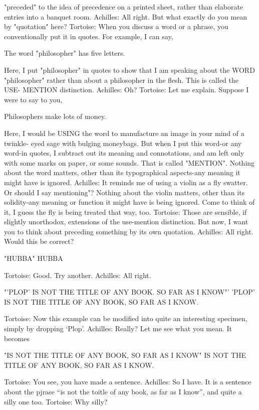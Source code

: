   "preceded" to the idea of precedence on a printed sheet, rather than elaborate entries
  into a banquet room.
Achilles: All right. But what exactly do you mean by "quotation" here? Tortoise: When
  you discuss a word or a phrase, you conventionally put it in quotes. For example, I can
  say,

                           The word "philosopher" has five letters.

  Here, I put "philosopher" in quotes to show that I am speaking about the WORD
  "philosopher" rather than about a philosopher in the flesh. This is called the USE-
  MENTION distinction.
Achilles: Oh?
Tortoise: Let me explain. Suppose I were to say to you,

                            Philosophers make lots of money.

  Here, I would be USING the word to manufacture an image in your mind of a twinkle-
  eyed sage with bulging moneybags. But when I put this word-or any word-in quotes, I
  subtract out its meaning and connotations, and am left only with some marks on paper,
  or some sounds. That is called "MENTION". Nothing about the word matters, other
  than its typographical aspects-any meaning it might have is ignored.
Achilles: It reminds me of using a violin as a fly swatter. Or should I say mentioning"?
  Nothing about the violin matters, other than its solidity-any meaning or function it
  might have is being ignored. Come to think of it, I guess the fly is being treated that
  way, too.
Tortoise: Those are sensible, if slightly unorthodox, extensions of the use-mention
  distinction. But now, I want you to think about preceding something by its own
  quotation.
Achilles: All right. Would this be correct?

                                    "HUBBA" HUBBA

Tortoise: Good. Try another.
Achilles: All right.

      "'PLOP' IS NOT THE TITLE OF ANY BOOK. SO FAR AS I KNOW"'
       'PLOP' IS NOT THE TITLE OF ANY BOOK, SO FAR AS I KNOW.

Tortoise: Now this example can be modified into quite an interesting specimen, simply
  by dropping `Plop'. Achilles: Really? Let me see what you mean. It becomes

      "IS NOT THE TITLE OF ANY BOOK, SO FAR AS I KNOW"
       IS NOT THE TITLE OF ANY BOOK, SO FAR AS I KNOW.

Tortoise: You see, you have made a sentence.
Achilles: So I have. It is a sentence about the pjrase “is not the toitle of any book, as far
  as I know”, and quite a silly one too.
Tortoise: Why silly?


